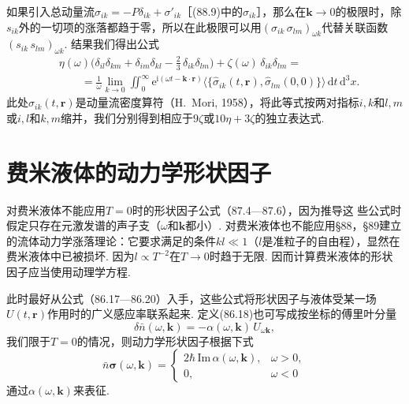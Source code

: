 如果引入总动量流$\sigma_{ik}=-P\delta_{ik}+{\sigma'}_{ik}$［(88.9)中的$\sigma_{ik}$］，那么在$\bm{k}\to0$的极限时，除$s_{ik}$外的一切项的涨落都趋于零，所以在此极限可以用$(\sigma_{ik}\,\sigma_{lm})_{\omega k}$代替关联函数$(s_{ik}\,s_{lm})_{\omega k}$. 结果我们得出公式
\begin{equation}
\begin{split}
&\eta(\omega)\biggl(\delta_{il}\delta_{km}+\delta_{im}\delta_{kl}-\frac{2}{3}\,\delta_{ik}\delta_{lm}\biggr)+\zeta(\omega)\,\delta_{ik}\delta_{lm}=\\
&\qquad=\frac{1}{\omega}\lim_{k\to0}\iint_{0}^{\infty}\mathrm{e}^{\mathrm{i}(\omega t-\bm{k}\cdot\bm{r})}\bigl\langle\bigl\{\hat{\sigma}_{ik}(t,\bm{r}),\hat{\sigma}_{lm}(0,0)\bigr\}\bigr\rangle\,\mathrm{d}t\,\mathrm{d}^{3}x.
\end{split}
\end{equation}
此处$\hat{\sigma}_{ik}(t,\bm{r})$是动量流密度算符（H.~Mori, 1958），将此等式按两对指标$i,k$和$l,m$或$i,l$和$k,m$缩并，我们分别得到相应于$9\zeta$或$10\eta+3\zeta$的独立表达式.

\section{费米液体的动力学形状因子}

对费米液体不能应用$T=0$时的形状因子公式（87.4—87.6），因为推导这
些公式时假定只存在元激发谱的声子支（$\omega$和$\bm{k}$都小）. 对费米液体也不能应用§88，§89建立的流体动力学涨落理论：它要求满足的条件$kl\ll1$（$l$是准粒子的自由程），显然在费米液体中已被损坏. 因为$l\propto T^{-2}$在$T\to0$时趋于无限. 因而计算费米液体的形状因子应当使用动理学方程.

此时最好从公式（86.17—86.20）入手，这些公式将形状因子与液体受某一场$U(t,\bm{r})$作用时的广义感应率联系起来. 定义(86.18)也可写成按坐标的傅里叶分量
\begin{equation}
\delta\bar{n}(\omega,\bm{k})=-\alpha(\omega,\bm{k})\,U_{\omega\bm{k}},
\end{equation}
我们限于$T=0$的情况，则动力学形状因子根据下式
\begin{equation}
\bar{n}\bm{\sigma}(\omega,\bm{k})=
\begin{cases}
2\hbar\,\mathrm{Im}\,\alpha(\omega,\bm{k}), & \omega>0,\\
0, & \omega<0
\end{cases}
\end{equation}
通过$\alpha(\omega,\bm{k})$来表征.

